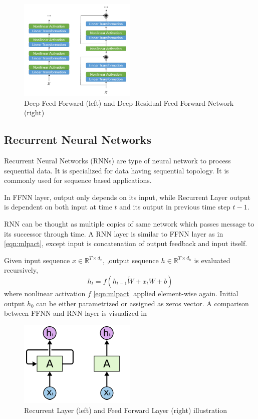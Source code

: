 \begin{figure}
	\centering
	\includegraphics[width=0.5\textwidth]{figures/ml_theory/rffnn_ffnn.png}
	\caption{Deep Feed Forward (left) and Deep Residual Feed Forward Network (right)}
	\label{fig:rffnn_ffnn}
\end{figure}

\subsection{Recurrent Neural Networks}

Recurrent Neural Networks (RNNs) \cite{rumelhart_learning_1986} are type of neural network to process sequential data. 
It is specialized for data having sequential topology. 
It is commonly used for sequence based applications. 

In FFNN layer, output only depends on its input, while Recurrent Layer output is dependent on both input at time $t$ and its output in previous time step $t-1$. 

RNN can be thought as multiple copies of same network which passes message to its successor through time. 
A RNN layer is similar to FFNN layer as in \eqref{eqn:mlpact}, 
except input is concatenation of output feedback and input itself.

Given input sequence $x \in \mathbb{R}^{T \times d_x}$, ,output sequence $h \in \mathbb{R}^{T \times d_h}$ is evaluated recursively,  
\begin{equation}
\label{eqn:rnnact}
h_t = f (h_{t-1} \tilde{W} + x_t W + b)
\end{equation}
where nonlinear activation $f$ \ref{eqn:mlpact} applied element-wise again. Initial output $h_0$ can be either parametrized or assigned as zeros vector. A comparison between FFNN and RNN layer is visualized in 

\begin{figure}
	\centering
	\includegraphics[width=0.5\textwidth]{figures/ml_theory/rnn_vs_ffnn_layer.png}
	\caption{Recurrent Layer (left) and Feed Forward Layer (right) illustration~\cite{olah_understanding_2015}}
	\label{fig:rnn_vs_ffnn}
\end{figure}

